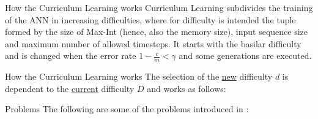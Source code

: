 \documentclass[xcolor={usenames}]{beamer}
\begin{document}
  \begin{frame}{How the Curriculum Learning works}
  	Curriculum Learning subdivides the training of the ANN in increasing difficulties, where for difficulty is intended the tuple formed by the size of Max-Int (hence, also the memory size), input sequence size and maximum number of allowed timesteps. It starts with the basilar difficulty and is changed when the error rate $1 - \frac{c}{m} < \gamma$ and some generations are executed.
  \end{frame}
  \begin{frame}{How the Curriculum Learning works}
  	The selection of the \underline{new} difficulty $d$ is dependent to the \underline{current} difficulty $D$ and works as follows:
  	\begin{itemize}
  	\end{itemize}
  \end{frame}
  \begin{frame}{Problems}
  	The following are some of the problems introduced in \cite{NRAM:2016}:
  	\begin{itemize}
  	\end{itemize}
  \end{frame}
\end{document}
